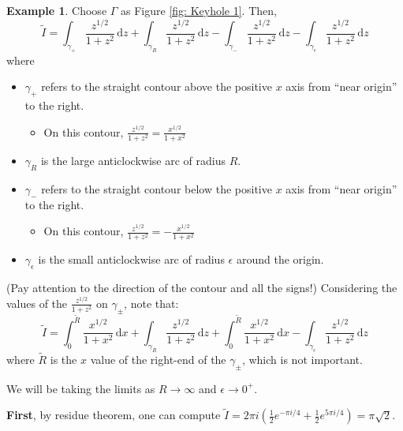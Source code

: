 \documentclass[a4paper, 12pt]{article}
\theoremstyle{definition}
\newtheorem{example}{Example}
\numberwithin{theorem}{section}
\numberwithin{definition}{section}
\numberwithin{exercise}{section}
\numberwithin{remark}{section}
\numberwithin{figure}{section}
\numberwithin{example}{section}
\newcommand{\intd}{\,\text{d}}
\begin{document}
\begin{example}
    Choose $\Gamma$ as Figure \ref{fig: Keyhole 1}.
    Then,
    \begin{equation*}
        \tilde I
        =
        \int_{\gamma_+} \frac{z^{1/2}}{1+z^2} \intd z
        +
        \int_{\gamma_R} \frac{z^{1/2}}{1+z^2} \intd z
        -
        \int_{\gamma_-} \frac{z^{1/2}}{1+z^2} \intd z
        -
        \int_{\gamma_\epsilon} \frac{z^{1/2}}{1+z^2} \intd z
    \end{equation*}
    where
    \begin{itemize}
        \item $\gamma_+$ refers to the straight contour above the positive $x$ axis from ``near origin'' to the right.
            \begin{itemize}
                \item On this contour, $\frac{z^{1/2}}{1+z^2} = \frac{x^{1/2}}{1+x^2}$
            \end{itemize}
        \item $\gamma_R$ is the large anticlockwise arc of radius $R$.
        \item $\gamma_-$ refers to the straight contour below the positive $x$ axis from ``near origin'' to the right.
            \begin{itemize}
                \item On this contour, $\frac{z^{1/2}}{1+z^2} = - \frac{x^{1/2}}{1+x^2}$
            \end{itemize}
        \item $\gamma_\epsilon$ is the small anticlockwise arc of radius $\epsilon$ around the origin.
    \end{itemize}
    (Pay attention to the direction of the contour and all the signs!)
    Considering the values of the $\frac{z^{1/2}}{1+z^2}$ on $\gamma_\pm$,
    note that:
    \begin{equation*}
        \tilde I
        =
        \int_0^{\tilde R} \frac{x^{1/2}}{1+x^2} \intd x
        +
        \int_{\gamma_R} \frac{z^{1/2}}{1+z^2} \intd z
        +
        \int_0^{\tilde R} \frac{x^{1/2}}{1+x^2} \intd x
        -
        \int_{\gamma_\epsilon} \frac{z^{1/2}}{1+z^2} \intd z
    \end{equation*}
    where $\tilde R$ is the $x$ value of the right-end of the $\gamma_{\pm}$,
    which is not important.

    We will be taking the limits as $R \rightarrow \infty$ and $\epsilon \rightarrow 0^+$.

    \textbf{First},
    by residue theorem,
    one can compute $\tilde I = 2\pi i \left( \frac{1}{2} e^{-\pi i / 4} + \frac{1}{2} e^{5 \pi i / 4} \right) = \pi \sqrt{2}$.


\end{example}
\end{document}
